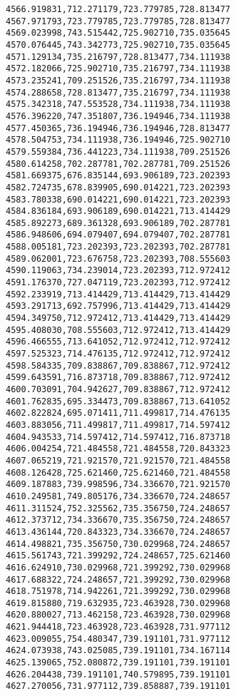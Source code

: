 \documentclass[11pt]{article}
\begin{document}
\begin{Verbatim}[commandchars=\\\{\}]
4566.919831,712.271179,723.779785,728.813477
4567.971793,723.779785,723.779785,728.813477
4569.023998,743.515442,725.902710,735.035645
4570.076445,743.342773,725.902710,735.035645
4571.129134,735.216797,728.813477,734.111938
4572.182066,725.902710,735.216797,734.111938
4573.235241,709.251526,735.216797,734.111938
4574.288658,728.813477,735.216797,734.111938
4575.342318,747.553528,734.111938,734.111938
4576.396220,747.351807,736.194946,734.111938
4577.450365,736.194946,736.194946,728.813477
4578.504753,734.111938,736.194946,725.902710
4579.559384,736.441223,734.111938,709.251526
4580.614258,702.287781,702.287781,709.251526
4581.669375,676.835144,693.906189,723.202393
4582.724735,678.839905,690.014221,723.202393
4583.780338,690.014221,690.014221,723.202393
4584.836184,693.906189,690.014221,713.414429
4585.892273,689.361328,693.906189,702.287781
4586.948606,694.079407,694.079407,702.287781
4588.005181,723.202393,723.202393,702.287781
4589.062001,723.676758,723.202393,708.555603
4590.119063,734.239014,723.202393,712.972412
4591.176370,727.047119,723.202393,712.972412
4592.233919,713.414429,713.414429,713.414429
4593.291713,692.757996,713.414429,713.414429
4594.349750,712.972412,713.414429,713.414429
4595.408030,708.555603,712.972412,713.414429
4596.466555,713.641052,712.972412,712.972412
4597.525323,714.476135,712.972412,712.972412
4598.584335,709.838867,709.838867,712.972412
4599.643591,716.873718,709.838867,712.972412
4600.703091,704.942627,709.838867,712.972412
4601.762835,695.334473,709.838867,713.641052
4602.822824,695.071411,711.499817,714.476135
4603.883056,711.499817,711.499817,714.597412
4604.943533,714.597412,714.597412,716.873718
4606.004254,721.484558,721.484558,720.843323
4607.065219,721.921570,721.921570,721.484558
4608.126428,725.621460,725.621460,721.484558
4609.187883,739.998596,734.336670,721.921570
4610.249581,749.805176,734.336670,724.248657
4611.311524,752.325562,735.356750,724.248657
4612.373712,734.336670,735.356750,724.248657
4613.436144,720.843323,734.336670,724.248657
4614.498821,735.356750,730.029968,724.248657
4615.561743,721.399292,724.248657,725.621460
4616.624910,730.029968,721.399292,730.029968
4617.688322,724.248657,721.399292,730.029968
4618.751978,714.942261,721.399292,730.029968
4619.815880,719.632935,723.463928,730.029968
4620.880027,713.462158,723.463928,730.029968
4621.944418,723.463928,723.463928,731.977112
4623.009055,754.480347,739.191101,731.977112
4624.073938,743.025085,739.191101,734.167114
4625.139065,752.080872,739.191101,739.191101
4626.204438,739.191101,740.579895,739.191101
4627.270056,731.977112,739.858887,739.191101

\end{Verbatim}
\end{document}
